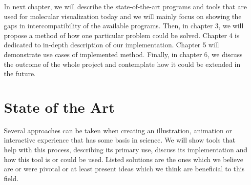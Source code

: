 \documentclass[
  digital, %
  table,   %
  nolof,     %
  nolot,     %
]{fithesis3}
\begin{document}



In next chapter, we will describe the state-of-the-art programs and tools that are used for molecular visualization today and we will mainly focus on showing the gaps in intercompatibility of the available programs. Then, in chapter 3, we will propose a method of how one particular problem could be solved. Chapter 4 is dedicated to in-depth description of our implementation. Chapter 5 will demonstrate use cases of implemented method. Finally, in chapter 6, we discuss the outcome of the whole project and contemplate how it could be extended in the future.

\chapter{State of the Art}
\label{chap:star}
Several approaches can be taken when creating an illustration, animation or interactive experience that has some basis in science. We will show tools that help with this process, describing its primary use, discuss its implementation and how this tool is or could be used. Listed solutions are the ones which we believe are or were pivotal or at least present ideas which we think are beneficial to this field.
\end{document}
